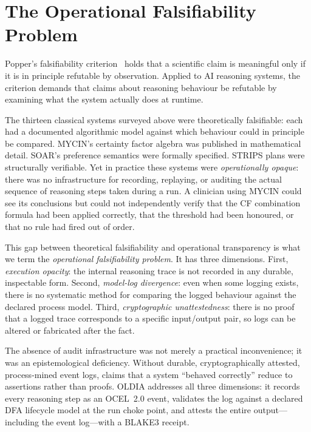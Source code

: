 \section{The Operational Falsifiability Problem}
\label{sec:falsifiability}

Popper's falsifiability criterion~\cite{popper1959} holds that a scientific
claim is meaningful only if it is in principle refutable by observation.
Applied to AI reasoning systems, the criterion demands that claims about
reasoning behaviour be refutable by examining what the system actually does at
runtime.

The thirteen classical systems surveyed above were theoretically falsifiable:
each had a documented algorithmic model against which behaviour could in
principle be compared.  MYCIN's certainty factor algebra was published in
mathematical detail.  SOAR's preference semantics were formally specified.
STRIPS plans were structurally verifiable.  Yet in practice these systems were
\emph{operationally opaque}: there was no infrastructure for recording,
replaying, or auditing the actual sequence of reasoning steps taken during a
run.  A clinician using MYCIN could see its conclusions but could not
independently verify that the CF combination formula had been applied
correctly, that the threshold had been honoured, or that no rule had fired
out of order.

This gap between theoretical falsifiability and operational transparency is
what we term the \emph{operational falsifiability problem}.  It has three
dimensions.  First, \emph{execution opacity}: the internal reasoning trace is
not recorded in any durable, inspectable form.  Second, \emph{model-log
divergence}: even when some logging exists, there is no systematic method for
comparing the logged behaviour against the declared process model.  Third,
\emph{cryptographic unattestedness}: there is no proof that a logged trace
corresponds to a specific input/output pair, so logs can be altered or
fabricated after the fact.

The absence of audit infrastructure was not merely a practical inconvenience;
it was an epistemological deficiency.  Without durable, cryptographically
attested, process-mined event logs, claims that a system ``behaved correctly''
reduce to assertions rather than proofs.  OLDIA addresses all three dimensions:
it records every reasoning step as an OCEL~2.0 event, validates the log
against a declared DFA lifecycle model at the run choke point, and attests the
entire output---including the event log---with a BLAKE3 receipt.

